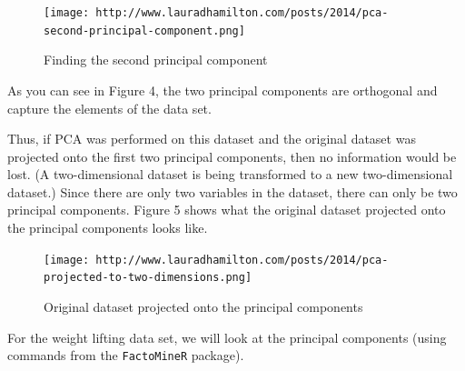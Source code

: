 \documentclass[12pt,twoside]{reedthesis}
\begin{document}
  \begin{figure}[htbp]
  \centering
  \texttt{[image: http://www.lauradhamilton.com/posts/2014/pca-second-principal-component.png]}
  \caption{Finding the second principal component}
  \end{figure}
  
  As you can see in Figure 4, the two principal components are orthogonal
  and capture the elements of the data set.
  
  \newpage
  
  Thus, if PCA was performed on this dataset and the original dataset was
  projected onto the first two principal components, then no information
  would be lost. (A two-dimensional dataset is being transformed to a new
  two-dimensional dataset.) Since there are only two variables in the
  dataset, there can only be two principal components. Figure 5 shows what
  the original dataset projected onto the principal components looks like.
  
  \begin{figure}[htbp]
  \centering
  \texttt{[image: http://www.lauradhamilton.com/posts/2014/pca-projected-to-two-dimensions.png]}
  \caption{Original dataset projected onto the principal components}
  \end{figure}
  
  \newpage
  
  For the weight lifting data set, we will look at the principal
  components (using commands from the \texttt{FactoMineR} package).
  
  \begin{Shaded}
  \begin{Highlighting}[]
  \StringTok{ }\NormalTok{(wl2[, -}\NormalTok{(}\NormalTok{,}\NormalTok{,}\NormalTok{)], } \NormalTok{)}
  
  \end{Highlighting}
  \end{Shaded}
  
\end{document}
